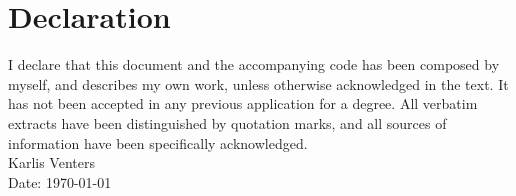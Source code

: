 \newpage
\section*{Declaration}

I declare that this document and the accompanying code has been composed by
myself, and describes my own work, unless otherwise acknowledged in the text.
It has not been accepted in any previous application for a degree. All verbatim
extracts have been distinguished by quotation marks, and all sources of
information have been specifically acknowledged.\\[5ex]

Karlis Venters \\[3ex]

Date: \today \\[3ex]
